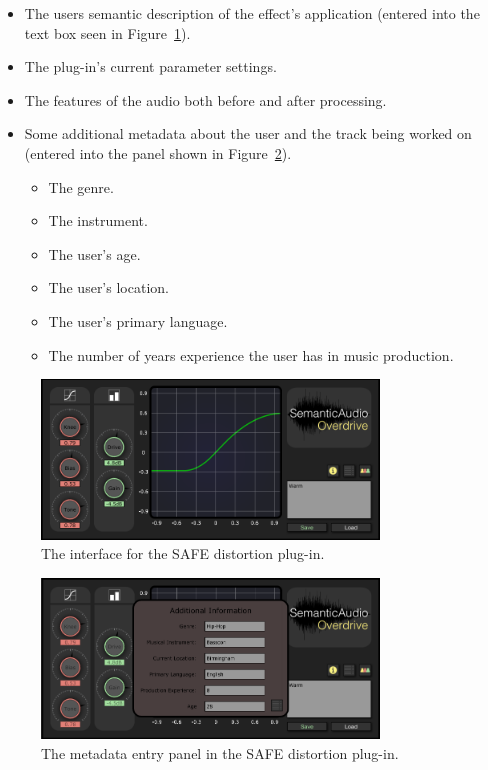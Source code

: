 		\begin{itemize}
			\item The users semantic description of the effect's application (entered into the text box seen in
				Figure~\ref{fig:SAFE-Distortion}).
			\item The plug-in's current parameter settings.
			\item The features of the audio both before and after processing.
			\item Some additional metadata about the user and the track being worked on (entered into the panel
				shown in Figure~\ref{fig:SAFE-Metadata}).
			\begin{itemize}
				\item The genre.
				\item The instrument.
				\item The user's age.
				\item The user's location.
				\item The user's primary language.
				\item The number of years experience the user has in music production.
			\end{itemize}
		\end{itemize}

		\begin{figure}[h!]
			\centering
			\includegraphics[width=0.8\textwidth]{chapter4/Images/SAFEDistortion.png}
			\caption{The interface for the SAFE distortion plug-in.}
			\label{fig:SAFE-Distortion}
		\end{figure}

		\begin{figure}[h!]
			\centering
			\includegraphics[width=0.8\textwidth]{chapter4/Images/SAFEMetadata.png}
			\caption{The metadata entry panel in the SAFE distortion plug-in.}
			\label{fig:SAFE-Metadata}
		\end{figure}

